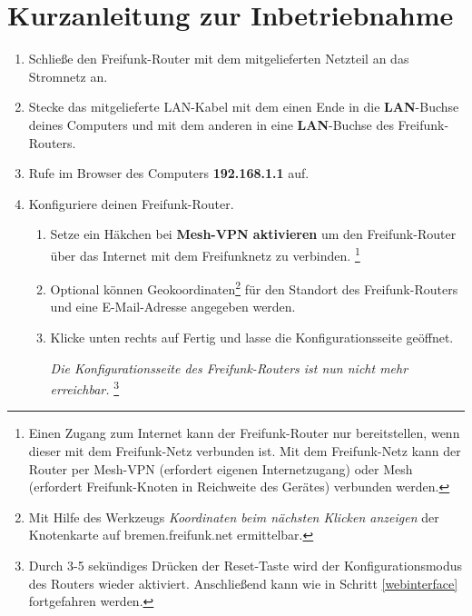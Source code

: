 \documentclass{article}
\begin{document}
\section*{Kurzanleitung zur Inbetriebnahme}

\begin{enumerate}
\item Schließe den Freifunk-Router mit dem mitgelieferten Netzteil an das Stromnetz an.

%

\item Stecke das mitgelieferte LAN-Kabel mit dem einen Ende in die \textbf{LAN}-Buchse deines Computers und mit dem anderen in eine \textbf{LAN}-Buchse des Freifunk-Routers.

\item Rufe im Browser des Computers \textbf{192.168.1.1} auf. \label{webinterface}

\item Konfiguriere deinen Freifunk-Router. 
\begin{enumerate}

%
  \item Setze ein Häkchen bei \glqq{}\textbf{Mesh-VPN aktivieren}\grqq{} um den Freifunk-Router über das Internet mit dem Freifunknetz zu verbinden. \label{vpn-mesh-aktivieren} \footnote{Einen Zugang zum Internet kann der Freifunk-Router nur bereitstellen, wenn dieser mit dem Freifunk-Netz verbunden ist. Mit dem Freifunk-Netz kann der Router per Mesh-VPN (erfordert eigenen Internetzugang) oder Mesh (erfordert Freifunk-Knoten in Reichweite des Gerätes) verbunden werden.}
  
  \item Optional können Geokoordinaten\footnote{Mit Hilfe des Werkzeugs \textit{Koordinaten beim nächsten Klicken anzeigen} der Knotenkarte auf bremen.freifunk.net ermittelbar.} für den Standort des Freifunk-Routers und eine E-Mail-Adresse angegeben werden.

  \item Klicke unten rechts auf \glqq{}Fertig\grqq{} und lasse die Konfigurationsseite geöffnet. \label{fertig}

  \textit{Die Konfigurationsseite des Freifunk-Routers ist nun nicht mehr erreichbar.} \footnote{Durch 3-5 sekündiges Drücken der Reset-Taste wird der Konfigurationsmodus des Routers wieder aktiviert. Anschließend kann wie in Schritt \ref{webinterface} fortgefahren werden.}
\end{enumerate}


\end{enumerate}
\end{document}
